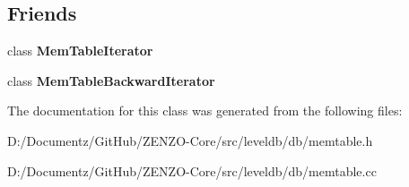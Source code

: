 \subsection*{Friends}
\begin{DoxyCompactItemize}
\item 
\mbox{\label{classleveldb_1_1_mem_table_ad6cb602bccb9af617c8cb348ae693d4a}} 
class {\bfseries Mem\+Table\+Iterator}
\item 
\mbox{\label{classleveldb_1_1_mem_table_ab6427243fb396d56604898725f9f2327}} 
class {\bfseries Mem\+Table\+Backward\+Iterator}
\end{DoxyCompactItemize}


The documentation for this class was generated from the following files\+:\begin{DoxyCompactItemize}
\item 
D\+:/\+Documentz/\+Git\+Hub/\+Z\+E\+N\+Z\+O-\/\+Core/src/leveldb/db/memtable.\+h\item 
D\+:/\+Documentz/\+Git\+Hub/\+Z\+E\+N\+Z\+O-\/\+Core/src/leveldb/db/memtable.\+cc\end{DoxyCompactItemize}
